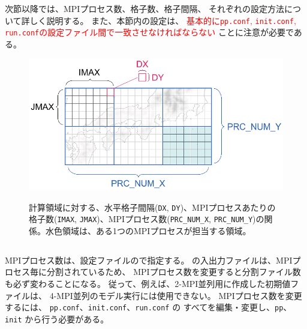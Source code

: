 次節以降では、MPIプロセス数、格子数、格子間隔、
それぞれの設定方法について詳しく説明する。
また、本節内の設定は、
\textcolor{red}{基本的に\texttt{pp.conf}, \texttt{init.conf}, \texttt{run.conf}の設定ファイル間で一致させなければならない}
ことに注意が必要である。


\begin{figure}[h]
\begin{center}
  \includegraphics[width=0.8\hsize]{./figure/domain_decomposition.eps}\\
  \caption{計算領域に対する、水平格子間隔(\texttt{DX}, \texttt{DY})、MPIプロセスあたりの格子数(\texttt{IMAX}, \texttt{JMAX})、MPIプロセス数(\texttt{PRC\_NUM\_X}, \texttt{PRC\_NUM\_Y})の関係。水色領域は、ある1つのMPIプロセスが担当する領域。}
  \label{fig:domain}
\end{center}
\end{figure}



\subsection{\SubsecMPIProcess} \label{subsec:relation_dom_reso2}

MPIプロセス数は、設定ファイルので指定する。
\scalerm の入出力ファイルは、MPIプロセス毎に分割されているため、
MPIプロセス数を変更すると分割ファイル数も必ず変わることになる。
従って、例えば、2-MPI並列用に作成した初期値ファイルは、
4-MPI並列のモデル実行には使用できない。
MPIプロセス数を変更するには、
\verb|pp.conf|、\verb|init.conf|、\verb|run.conf| の
すべてを編集・変更し、\verb|pp|、\verb|init| から行う必要がある。\\

\\


